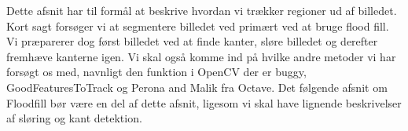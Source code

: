 {
{\sffamily Dette afsnit har til formål at beskrive hvordan vi trækker
regioner ud af billedet. Kort sagt forsøger vi at segmentere billedet
ved primært ved at bruge flood fill. Vi præparerer dog først billedet
ved at finde kanter, sløre billedet og derefter fremhæve kanterne igen.
Vi skal også komme ind på hvilke andre metoder vi har forsøgt os med,
navnligt den funktion i OpenCV der er buggy, GoodFeaturesToTrack og
Perona and Malik fra Octave. Det følgende afsnit om Floodfill bør være
en del af dette afsnit, ligesom vi skal have lignende beskrivelser af
sløring og kant detektion.
}


}

